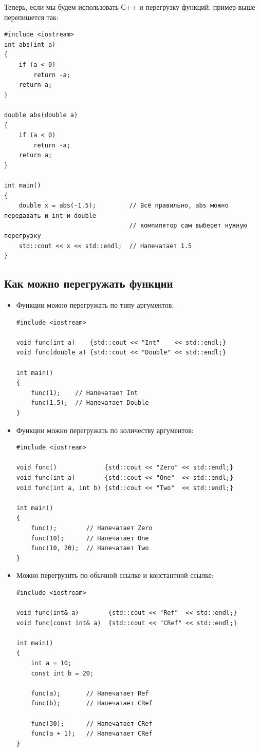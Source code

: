 \documentclass{article}
\begin{document}
Теперь, если мы будем использовать С++ и перегрузку функций,  пример выше перепишется так:
\begin{lstlisting}
#include <iostream>
int abs(int a)
{
    if (a < 0)
        return -a;
    return a;
}

double abs(double a)
{
    if (a < 0)
        return -a;
    return a;
}

int main()
{
    double x = abs(-1.5);         // Всё правильно, abs можно передавать и int и double
                                  // компилятор сам выберет нужную перегрузку
    std::cout << x << std::endl;  // Напечатает 1.5
}
\end{lstlisting}


\subsection*{Как можно перегружать функции}

\begin{itemize}
\item Функции можно перегружать по типу аргументов:
\begin{lstlisting}
#include <iostream>

void func(int a)    {std::cout << "Int"    << std::endl;}
void func(double a) {std::cout << "Double" << std::endl;}

int main()
{
    func(1);    // Напечатает Int
    func(1.5);  // Напечатает Double
}
\end{lstlisting}

\newpage
\item Функции можно перегружать по количеству аргументов:
\begin{lstlisting}
#include <iostream>

void func()             {std::cout << "Zero" << std::endl;}
void func(int a)        {std::cout << "One"  << std::endl;}
void func(int a, int b) {std::cout << "Two"  << std::endl;}

int main()
{
    func();        // Напечатает Zero
    func(10);      // Напечатает One
    func(10, 20);  // Напечатает Two
}
\end{lstlisting}

\item Можно перегрузить по обычной ссылке и константной ссылке:
\begin{lstlisting}
#include <iostream>

void func(int& a)        {std::cout << "Ref"  << std::endl;}
void func(const int& a)  {std::cout << "CRef" << std::endl;}

int main()
{
    int a = 10;
    const int b = 20;
    
    func(a);       // Напечатает Ref
    func(b);       // Напечатает CRef
    
    func(30);      // Напечатает CRef
    func(a + 1);   // Напечатает CRef
}
\end{lstlisting}
\end{itemize}
\end{document}
